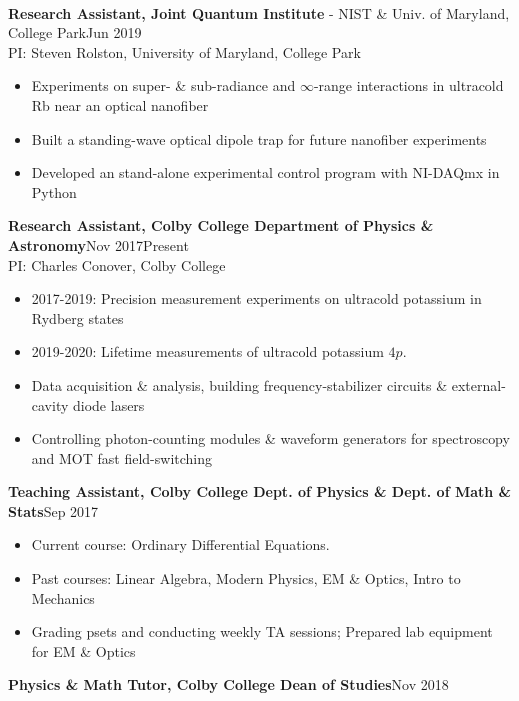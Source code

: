 \documentclass[letter, 9pt]{article}
\newcommand{\longunderline}[1]{\uline{#1\hfill\mbox{}}}
\begin{document}
	\vspace{-7pt}
	\noindent \longunderline{\normalsize{{}}}
	\\ \vspace{-7pt}
	
	\noindent \textbf{Research Assistant, Joint Quantum Institute} - NIST \& Univ. of Maryland, College Park\hfill Jun 2019\textemdash \\ 
	\noindent PI: {Steven Rolston}, University of Maryland, College Park
	\begin{itemize}[noitemsep, nolistsep]
		\item Experiments on super- \& sub-radiance and $\infty$-range interactions in ultracold Rb near an optical nanofiber
		\item Built a standing-wave optical dipole trap for future nanofiber experiments
		\item Developed an stand-alone experimental control program with NI-DAQmx in Python
	\end{itemize}
	\textbf{Research Assistant, Colby College Department of Physics \& Astronomy}\hfill Nov 2017\textemdash Present\\
	PI: {Charles Conover}, Colby College
	\begin{itemize}[noitemsep, nolistsep]
		\item 2017-2019: Precision measurement experiments on ultracold potassium in Rydberg states
		\item 2019-2020: Lifetime measurements of ultracold potassium $4p$.
		\item Data acquisition \& analysis, building frequency-stabilizer circuits \& external-cavity diode lasers
		\item Controlling photon-counting modules \& waveform generators for spectroscopy and MOT fast field-switching

	\end{itemize}	
 	\textbf{Teaching Assistant, Colby College Dept. of Physics \& Dept. of Math \& Stats}\hfill Sep  2017\textemdash  
	\begin{itemize}[noitemsep, nolistsep]
		\item Current course: Ordinary Differential Equations. 
		\item Past courses: Linear Algebra, Modern Physics, EM \& Optics, Intro to Mechanics
		\item Grading psets and conducting weekly TA sessions; Prepared lab equipment for EM \& Optics
	\end{itemize}
	\textbf{Physics \& Math Tutor, Colby College Dean of Studies}\hfill Nov 2018\textemdash 
\end{document}
